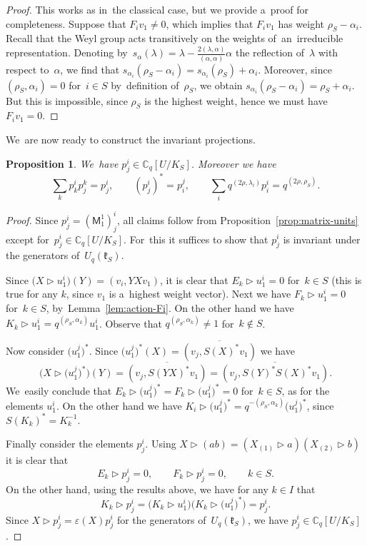 \documentclass[10pt,a4paper]{amsart}
\numberwithin{equation}{section}
\newtheorem{Proposition}[Theorem]{Proposition}
 { \theoremstyle{definition}
\newtheorem{Definition}[Theorem]{Definition}
\newtheorem{Note}[Theorem]{Note}
\newtheorem{Example}[Theorem]{Example}
\newtheorem{Remark}[Theorem]{Remark} }
\newcommand{\UqkS}{U_q(\mathfrak{k}_S)}
\newcommand{\Cqflag}{\mathbb{C}_q[U / K_S]}
\newcommand{\matuni}{\mathsf{M}}
\begin{document}
\begin{proof}
This works as in~the classical case, but we provide a~proof for completeness.
Suppose that $F_i v_1 \neq 0$, which implies that $F_i v_1$ has weight $\rho_S - \alpha_i$.
Recall that the Weyl group acts transitively on the weights of~an~irreducible representation.
Denoting by~$s_\alpha(\lambda) = \lambda - \frac{2 (\lambda, \alpha)}{(\alpha, \alpha)} \alpha$ the reflection of~$\lambda$ with respect to~$\alpha$, we find that $s_{\alpha_i}(\rho_S - \alpha_i) = s_{\alpha_i}(\rho_S) + \alpha_i$.
Moreover, since $(\rho_S, \alpha_i) = 0$ for~$i \in S$ by~definition of~$\rho_S$, we obtain $s_{\alpha_i}(\rho_S - \alpha_i) = \rho_S + \alpha_i$.
But this is impossible, since $\rho_S$ is the highest weight, hence we must have $F_i v_1 = 0$.
\end{proof}

We~are now ready to construct the invariant projections.

\begin{Proposition}
\label{prop:p-properties}
We~have $p^i_j \in \Cqflag$. Moreover we have
\[
\sum_k p^i_k p^k_j = p^i_j, \qquad
(p^i_j)^* = p^j_i, \qquad
\sum_i q^{(2 \rho, \lambda_i)} p^i_i = q^{(2 \rho, \rho_S)}.
\]
\end{Proposition}

\begin{proof}
Since $p^i_j = (\matuni^1_1)^i_j$, all claims follow from Proposition~\ref{prop:matrix-units} except for~$p^i_j \in \Cqflag$.
For~this it suffices to show that $p^i_j$ is invariant under the generators of~$\UqkS$.

Since $\big(X \triangleright u^i_1\big)(Y) = (v_i, Y X v_1)$, it is clear that $E_k \triangleright u^i_1 = 0$ for~$k \in S$ (this is true for any $k$, since $v_1$ is a~highest weight vector).
Next we have $F_k \triangleright u^i_1 = 0$ for~$k \in S$, by~Lemma~\ref{lem:action-Fi}.
On the other hand we have $K_k \triangleright u^i_1 = q^{(\rho_S, \alpha_k)} u^i_1$. Observe that $q^{(\rho_S, \alpha_k)} \neq 1$ for~$k \notin S$.

Now consider $\big(u^j_1\big)^*$. Since $\big(u^j_1\big)^*(X) = \overline{(v_j, S(X)^* v_1)}$ we have
\[
\big(X \triangleright \big(u^j_1\big)^*\big)(Y) = \overline{(v_j, S(Y X)^* v_1)} = \overline{(v_j, S(Y)^* S(X)^* v_1)}.
\]
We~easily conclude that $E_k \triangleright \big(u^j_1\big)^* = F_k \triangleright \big(u^j_1\big)^* = 0$ for~$k \in S$, as for the elements $u^i_1$.
On the other hand we have $K_i \triangleright \big(u^j_1\big)^* = q^{-(\rho_S, \alpha_k)} \big(u^j_1\big)^*$, since $S(K_k)^* = K_k^{-1}$.

Finally consider the elements $p^i_j$. Using $X \triangleright (a b) = (X_{(1)} \triangleright a) (X_{(2)} \triangleright b)$ it is clear that
\[
E_k \triangleright p^i_j = 0, \qquad
F_k \triangleright p^i_j = 0, \qquad
k \in S.
\]
On the other hand, using the results above, we have for any $k \in I$ that
\[
K_k \triangleright p^i_j = \big(K_k \triangleright u^i_1\big) \big(K_k \triangleright \big(u^j_1\big)^*\big) = p^i_j.
\]
Since $X \triangleright p^i_j = \varepsilon(X) p^i_j$ for the generators of~$\UqkS$, we have $p^i_j \in \Cqflag$.
\end{proof}
\end{document}
